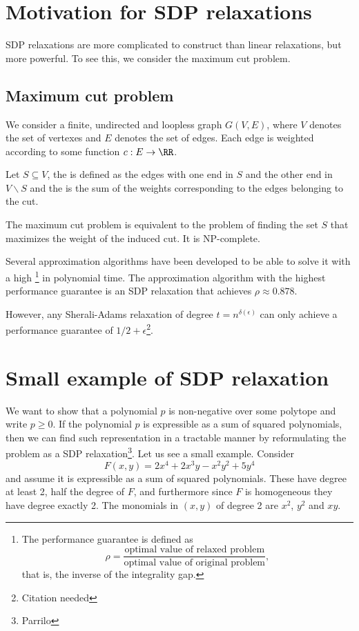 \documentclass[a4paper,twoside,justified]{tufte-handout}
\begin{document}
 

\section{Motivation for SDP relaxations}
SDP relaxations are more complicated to construct than linear relaxations, but more powerful. To see this, we consider the maximum cut problem.

\subsection{Maximum cut problem\cite{poljak1995maximumcut}}
We consider a finite, undirected and loopless graph $G(V,E)$, where $V$ denotes the set of vertexes and $E$ denotes the set of edges. Each edge is weighted according to some function $c:E\rightarrow \RR$. 

Let $S\subseteq V$, the  is defined as the edges with one end in $S$ and the other end in $V\backslash S$ and the  is the sum of the weights corresponding to the edges belonging to the cut. 

The maximum cut problem is equivalent to the problem of finding the set $S$ that maximizes the weight of the induced cut. It is NP-complete\cite{karp1972NPhard}.

Several approximation algorithms have been developed to be able to solve it with a high \footnote{The performance guarantee is defined as
\begin{equation*}
\rho=\frac{\text{optimal value of relaxed problem}}{\text{optimal value of original problem}},
\end{equation*}
that is, the inverse of the integrality gap.} in polynomial time. The approximation algorithm with the highest performance guarantee is an SDP relaxation that achieves $\rho\approx 0.878$.

However, any Sherali-Adams relaxation of degree $t=n^{\delta(\epsilon)}$ can only achieve a performance guarantee of $1/2 + \epsilon$\footnote{Citation needed}.

\section{Small example of SDP relaxation}
We want to show that a polynomial $p$ is non-negative over some polytope and write $p\geq 0$. If the polynomial $p$ is expressible as a sum of squared polynomials, then we can find such representation in a tractable manner by reformulating the problem as a SDP relaxation\footnote{Parrilo}. Let us see a small example. Consider
\begin{equation*}
F(x,y)=2x^4+2x^3y-x^2y^2+5y^4
\end{equation*}
and assume it is expressible as a sum of squared polynomials. These have degree at least 2, half the degree of $F$, and furthermore since $F$ is homogeneous they have degree exactly 2. The monomials in $(x,y)$ of degree 2 are $x^2$, $y^2$ and $xy$.
\end{document}
